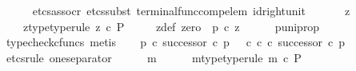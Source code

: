 \begin{isabellebody}
\ \ \ \ \isamarkupfalse%
\ {\isacharparenleft}{\kern0pt}etcs{\isacharunderscore}{\kern0pt}assocr{\isacharcomma}{\kern0pt}\ etcs{\isacharunderscore}{\kern0pt}subst\ terminal{\isacharunderscore}{\kern0pt}func{\isacharunderscore}{\kern0pt}comp{\isacharunderscore}{\kern0pt}elem\ id{\isacharunderscore}{\kern0pt}right{\isacharunderscore}{\kern0pt}unit{}{\isacharcomma}{\kern0pt}\ {\isacharminus}{\kern0pt}{\isacharparenright}{\kern0pt}\isanewline
\ \ \isamarkupfalse%
\ \isamarkupfalse%
\ z{\isacharprime}{\kern0pt}\ \isanewline
\ \ \ \ z{\isacharprime}{\kern0pt}{\isacharunderscore}{\kern0pt}type{\isacharbrackleft}{\kern0pt}type{\isacharunderscore}{\kern0pt}rule{\isacharbrackright}{\kern0pt}{\isacharcolon}{\kern0pt}\ {\isachardoublequoteopen}z{\isacharprime}{\kern0pt}\ {\isasymin}\isactrlsub c\ P{\isachardoublequoteclose}\ \isanewline
\ \ \ \ z{\isacharprime}{\kern0pt}{\isacharunderscore}{\kern0pt}def{\isacharcolon}{\kern0pt}\ {\isachardoublequoteopen}zero\ {\isacharequal}{\kern0pt}\ p{\isacharprime}{\kern0pt}\ {\isasymcirc}\isactrlsub c\ z{\isacharprime}{\kern0pt}{\isachardoublequoteclose}\isanewline
\ \ \ \ \isamarkupfalse%
\ p{\isacharprime}{\kern0pt}{\isacharunderscore}{\kern0pt}uni{\isacharunderscore}{\kern0pt}prop\ \isamarkupfalse%
\ {\isacharparenleft}{\kern0pt}typecheck{\isacharunderscore}{\kern0pt}cfuncs{\isacharcomma}{\kern0pt}\ metis{\isacharparenright}{\kern0pt}\isanewline
\isanewline
\ \ \isamarkupfalse%
\ {\isachardoublequoteopen}p\ {\isasymcirc}\isactrlsub c\ successor\ {\isasymcirc}\isactrlsub c\ p{\isacharprime}{\kern0pt}\ {\isacharequal}{\kern0pt}\ {\isacharparenleft}{\kern0pt}{\isasymt}\ {\isasymcirc}\isactrlsub c\ {\isasymbeta}\isactrlbsub {\isasymnat}\isactrlsub c\isactrlesub {\isacharparenright}{\kern0pt}\ {\isasymcirc}\isactrlsub c\ successor\ {\isasymcirc}\isactrlsub c\ p{\isacharprime}{\kern0pt}{\isachardoublequoteclose}\isanewline
\ \ \isamarkupfalse%
\ {\isacharparenleft}{\kern0pt}etcs{\isacharunderscore}{\kern0pt}rule\ one{\isacharunderscore}{\kern0pt}separator{\isacharparenright}{\kern0pt}\isanewline
\ \ \ \ \isamarkupfalse%
\ m\isanewline
\ \ \ \ \isamarkupfalse%
\ m{\isacharunderscore}{\kern0pt}type{\isacharbrackleft}{\kern0pt}type{\isacharunderscore}{\kern0pt}rule{\isacharbrackright}{\kern0pt}{\isacharcolon}{\kern0pt}\ {\isachardoublequoteopen}m\ {\isasymin}\isactrlsub c\ P{\isachardoublequoteclose}\isanewline
\isanewline
\ \ \ \ \isamarkupfalse%

\end{isabellebody}
